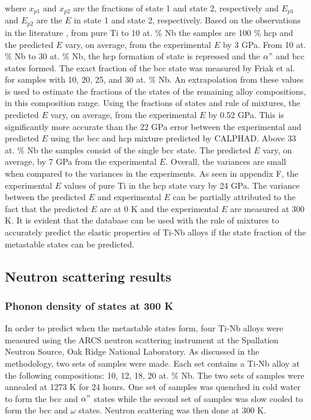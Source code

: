 \noindent where $x_{p1}$ and $x_{p2}$ are the fractions of state 1 and state 2, respectively and $E_{p1}$ and $E_{p2}$ are the $E$ in state 1 and state 2, respectively. Based on the observations in the literature \cite{Friak2012,Timoshevskii2011,Friak2012,Karre2015}, from pure Ti to 10 at. \% Nb the samples are 100 \% hcp and the predicted $E$ vary, on average, from the experimental $E$ by 3 GPa. From 10 at. \% Nb to 30 at. \% Nb, the hcp formation of state is repressed and the $\alpha"$ and bcc states formed. The exact fraction of the bcc state was measured by Friak et al. \cite{Friak2012} for samples with 10, 20, 25, and 30 at. \% Nb. An extrapolation from these values is used to estimate the fractions of the states of the remaining alloy compositions, in this composition range. Using the fractions of states and rule of mixtures, the predicted $E$ vary, on average, from the experimental $E$ by 0.52 GPa. This is significantly more accurate than the 22 GPa error between the experimental and predicted $E$ using the bcc and hcp mixture predicted by CALPHAD. Above 33 at. \% Nb the samples consist of the single bcc state. The predicted $E$ vary, on average, by 7 GPa from the experimental $E$. Overall, the variances are small when compared to the variances in the experiments. As seen in appendix F, the experimental $E$ values of pure Ti in the hcp state vary by 24 GPa. The variance between the predicted $E$ and experimental $E$ can be partially attributed to the fact that the predicted $E$ are at 0 K and the experimental $E$ are measured at 300 K. It is evident that the database can be used with the rule of mixtures to accurately predict the elastic properties of Ti-Nb alloys if the state fraction of the metastable states can be predicted.

\subsection{Neutron scattering results}

\subsubsection{Phonon density of states at 300 K}

In order to predict when the metastable states form, four Ti-Nb alloys were measured using the ARCS neutron scattering instrument at the Spallation Neutron Source, Oak Ridge National Laboratory. As discussed in the methodology, two sets of samples were made. Each set contains a Ti-Nb alloy at the following compositions: 10, 12, 18, 20 at. \% Nb. The two sets of samples were annealed at 1273 K for 24 hours. One set of samples was quenched in cold water to form the bcc and $\alpha"$ states while the second set of samples was slow cooled to form the bcc and $\omega$ states. Neutron scattering was then done at 300 K.

